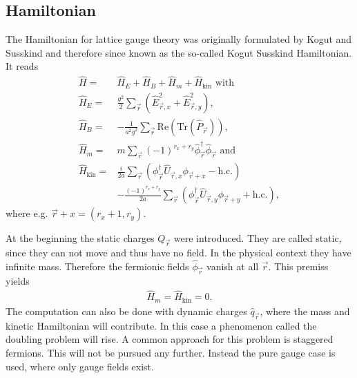 \subsection{Hamiltonian}
The Hamiltonian for lattice gauge theory was originally formulated by Kogut and Susskind \cite{PhysRevD.11.395} and therefore since known as the so-called Kogut Susskind Hamiltonian. It reads
\begin{align*}
	\hat{H}            = & \hat{H}_E+\hat{H}_B+\hat{H}_m+\hat{H}_{\text{kin}}\text{ with}                                                              \\
	\hat{H}_E          = & \frac{g^2}{2}\sum_{\vec{r}} \left(\hat{E}^2_{\vec{r},x}+\hat{E}^2_{\vec{r},y}\right),                                       \\
  \hat{H}_B          = & -\frac{1}{a^2g^2}\sum_{\vec{r}} \text{Re}(\text{Tr}(\hat{P}_{\vec{r}})),                                     \\
	\hat{H}_m          = & m\sum_{\vec{r}}(-1)^{r_x+r_y}\hat{\phi}^{\dag}_{\vec{r}}\hat{\phi}_{\vec{r}}\text{ and}                                     \\
	\hat{H}_\text{kin} = & \frac{i}{2a}\sum_{\vec{r}}\left(\phi^{\dag}_{\vec{r}}\hat{U}_{\vec{r}, x}\phi_{\vec{r}+x}-\text{h.c.}\right)                \\
	                     & -\frac{(-1)^{r_x+r_y}}{2a}\sum_{\vec{r}}\left(\phi^{\dag}_{\vec{r}}\hat{U}_{\vec{r}, y}\phi_{\vec{r}+y}+\text{h.c.}\right),
\end{align*}
where e.g. $\vec{r}+x=(r_x+1,r_y)$.

At the beginning the static charges $Q_{\vec{r}}$ were introduced. They are called static, since they can not move and thus have no field. In the physical context they have infinite mass. Therefore the fermionic fields $\hat{\phi}_{\vec{r}}$ vanish at all $\vec{r}$. This premiss yields
\begin{align*}
	\hat{H}_{m}=\hat{H}_{\text{kin}}=0.
\end{align*}
The computation can also be done with dynamic charges $\hat{q}_{\vec{r}}$, where the mass and kinetic Hamiltonian will contribute. In this case a phenomenon called the doubling problem will rise. A common approach for this problem is staggered fermions.\cite{rothe2005lattice} This will not be pursued any further. Instead the pure gauge case is used, where only gauge fields exist.

